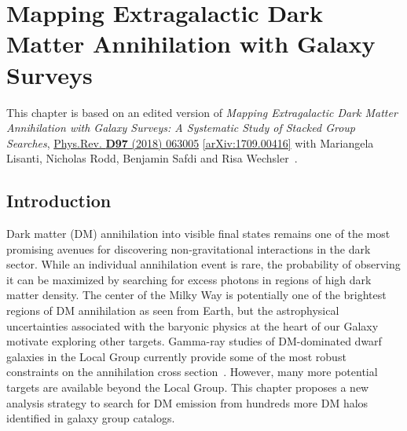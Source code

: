 \chapter{Mapping Extragalactic Dark Matter Annihilation with Galaxy Surveys}
\label{ch:groups_sim}

This chapter is based on an edited version of \emph{Mapping Extragalactic Dark Matter Annihilation with Galaxy Surveys: A Systematic Study of Stacked Group Searches},  \href{https://journals.aps.org/prd/abstract/10.1103/PhysRevD.97.063005}{Phys.Rev. \textbf{D97} (2018) 063005} \href{https://arxiv.org/abs/1709.00416}{[arXiv:1709.00416]} with Mariangela Lisanti, Nicholas Rodd, Benjamin Safdi and Risa Wechsler~\cite{Lisanti:2017qoz}.

\section{Introduction}

Dark matter (DM) annihilation into visible final states remains one of the most promising avenues for discovering non-gravitational interactions in the dark sector.  While an individual annihilation event is rare, the probability of observing it can be maximized by searching for excess photons in regions of high dark matter density.  The center of the Milky Way is potentially one of the brightest regions of DM annihilation as seen from Earth, but the astrophysical uncertainties associated with the baryonic physics at the heart of our Galaxy motivate exploring other targets.  Gamma-ray studies of DM-dominated dwarf galaxies in the Local Group currently provide some of the most robust constraints on the annihilation cross section~\cite{Fermi-LAT:2016uux, Ackermann:2015zua}.  However, many more potential targets are available beyond the Local Group.  This chapter proposes a new analysis strategy to search for DM emission from hundreds more DM halos identified in galaxy group catalogs.  

